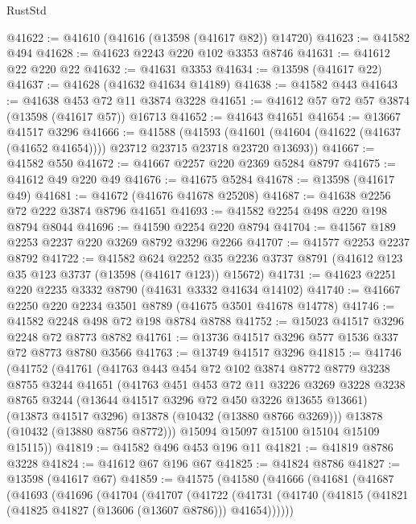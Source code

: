 \begin{lexlean}{RustStd}
\begin{coremodule}
@41622 := @41610 (@41616 (@13598 (@41617 @82)) @14720)
@41623 := @41582 @494
@41628 := @41623 @2243 @220 @102 @3353 @8746
@41631 := @41612 @22 @220 @22
@41632 := @41631 @3353
@41634 := @13598 (@41617 @22)
@41637 := @41628 (@41632 @41634 @14189)
@41638 := @41582 @443
@41643 := @41638 @453 @72 @11 @3874 @3228
@41651 := @41612 @57 @72 @57 @3874 (@13598 (@41617 @57)) @16713
@41652 := @41643 @41651
@41654 := @13667 @41517 @3296
@41666 := @41588
    (@41593 (@41601 (@41604 (@41622 (@41637 (@41652 @41654)))) @23712 @23715 @23718 @23720 @13693))
@41667 := @41582 @550
@41672 := @41667 @2257 @220 @2369 @5284 @8797
@41675 := @41612 @49 @220 @49
@41676 := @41675 @5284
@41678 := @13598 (@41617 @49)
@41681 := @41672 (@41676 @41678 @25208)
@41687 := @41638 @2256 @72 @222 @3874 @8796 @41651
@41693 := @41582 @2254 @498 @220 @198 @8794 @8044
@41696 := @41590 @2254 @220 @8794
@41704 := @41567 @189 @2253 @2237 @220 @3269 @8792 @3296 @2266
@41707 := @41577 @2253 @2237 @8792
@41722 := @41582
    @624
    @2252
    @35
    @2236
    @3737
    @8791
    (@41612 @123 @35 @123 @3737 (@13598 (@41617 @123)) @15672)
@41731 := @41623 @2251 @220 @2235 @3332 @8790 (@41631 @3332 @41634 @14102)
@41740 := @41667 @2250 @220 @2234 @3501 @8789 (@41675 @3501 @41678 @14778)
@41746 := @41582 @2248 @498 @72 @198 @8784 @8788
@41752 := @15023 @41517 @3296 @2248 @72 @8773 @8782
@41761 := @13736 @41517 @3296 @577 @1536 @337 @72 @8773 @8780 @3566
@41763 := @13749 @41517 @3296
@41815 := @41746
    (@41752
      (@41761
        (@41763
          @443
          @454
          @72
          @102
          @3874
          @8772
          @8779
          @3238
          @8755
          @3244
          @41651
          (@41763
            @451
            @453
            @72
            @11
            @3226
            @3269
            @3228
            @3238
            @8765
            @3244
            (@13644 @41517 @3296 @72 @450 @3226 @13655 @13661)
            (@13873 @41517 @3296)
            @13878
            (@10432 (@13880 @8766 @3269)))
          @13878
          (@10432 (@13880 @8756 @8772)))
        @15094
        @15097
        @15100
        @15104
        @15109
        @15115))
@41819 := @41582 @496 @453 @196 @11
@41821 := @41819 @8786 @3228
@41824 := @41612 @67 @196 @67
@41825 := @41824 @8786
@41827 := @13598 (@41617 @67)
@41859 := @41575
    (@41580
      (@41666
        (@41681
          (@41687
            (@41693
              (@41696
                (@41704
                  (@41707
                    (@41722
                      (@41731
                        (@41740 (@41815 (@41821 (@41825 @41827 (@13606 (@13607 @8786))) @41654))))))

\end{coremodule}
\end{lexlean}
